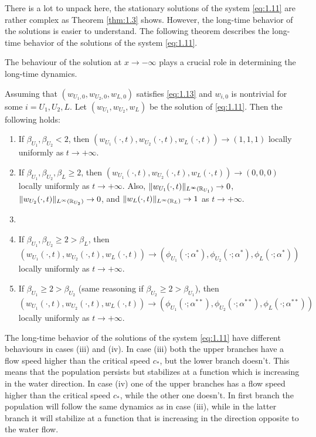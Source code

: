 There is a lot to unpack here, the stationary solutions of the system \eqref{eq:1.11} are rather complex as Theorem \ref{thm:1.3} shows. However, the long-time behavior of the solutions is easier to understand. The following theorem describes the long-time behavior of the solutions of the system \eqref{eq:1.11}.
\begin{remark}
    The behaviour of the solution at \(x \to -\infty\) plays a crucial role in determining the long-time dynamics.
\end{remark}
\begin{theorem}
    Assuming that \((w_{U_1, 0}, w_{U_2, 0}, w_{L, 0})\) satisfies \eqref{eq:1.13} and \(w_{i,0}\) is nontrivial for some \(i = U_1, U_2, L\). Let \((w_{U_1}, w_{U_2}, w_L)\) be the solution of \eqref{eq:1.11}. Then the following holds:
    \begin{enumerate}[label=(\roman*)]
        \item If \(\beta_{U_1}, \beta_{U_2} < 2\), then \((w_{U_1}(\cdot, t), w_{U_2}(\cdot, t), w_L(\cdot, t)) \to (1, 1, 1)\) locally uniformly as \(t \to +\infty\).
        \item If \(\beta_{U_1}, \beta_{U_2}, \beta_L \geq 2\), then \((w_{U_1}(\cdot, t), w_{U_2}(\cdot, t), w_L(\cdot, t)) \to (0, 0, 0)\) locally uniformly as \(t \to +\infty\). Also, \(\lVert w_{U_1}(\cdot, t)\rVert_{L^\infty(\mathbb{R}_{U_1})} \to 0\), \(\lVert w_{U_2}(\cdot, t)\rVert_{L^\infty(\mathbb{R}_{U_2})} \to 0\), and \(\lVert w_L(\cdot, t)\rVert_{L^\infty(\mathbb{R}_L)} \to 1\) as \(t \to +\infty\).
        \item 
        \item If \(\beta_{U_1}, \beta_{U_2} \geq 2 > \beta_L\), then 
        \[
            (w_{U_1}(\cdot, t), w_{U_2}(\cdot, t), w_L(\cdot, t)) \to (\phi_{U_1}(\cdot; \alpha^{*}), \phi_{U_2}(\cdot; \alpha^{*}), \phi_L(\cdot; \alpha^{*}))
        \]
        locally uniformly as \(t \to +\infty\).
        \item If \(\beta_{U_1} \geq 2 > \beta_{U_2}\) (same reasoning if \(\beta_{U_2} \geq 2 > \beta_{U_1}\)), then
        \[
            (w_{U_1}(\cdot, t), w_{U_2}(\cdot, t), w_L(\cdot, t)) \to (\phi_{U_1}(\cdot; \alpha^{**}), \phi_{U_2}(\cdot; \alpha^{**}), \phi_L(\cdot; \alpha^{**}))
        \]
        locally uniformly as \(t \to +\infty\).
    \end{enumerate}
    \label{thm:1.4}
\end{theorem}
The long-time behavior of the solutions of the system \eqref{eq:1.11} have different behaviours in cases (iii) and (iv). In case (iii) both the upper branches have a flow speed higher than the critical speed \(c_*\), but the lower branch doesn't. This means that the population persists but stabilizes at a function which is increasing in the water direction. In case (iv) one of the upper branches has a flow speed higher than the critical speed \(c_*\), while the other one doesn't. In first branch the population will follow the same dynamics as in case (iii), while in the latter branch it will stabilize at a function that is increasing in the direction opposite to the water flow.

